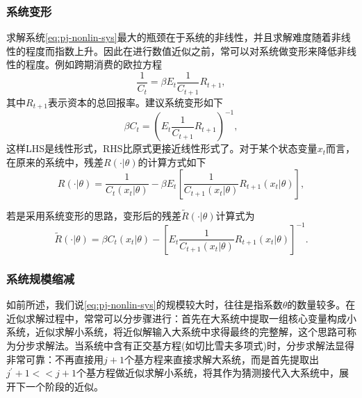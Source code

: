 \subsubsection{系统变形}
\label{sec:pj-approximation-tips-transformation}
求解系统\eqref{eq:pj-nonlin-sys}最大的瓶颈在于系统的非线性，并且求解难度随着非线性的程度而指数上升。因此在进行数值近似之前，常可以对系统做变形来降低非线性的程度。例如跨期消费的欧拉方程
\begin{equation*}
  \frac{1}{C_{t}} = \beta E_{t} \frac{1}{C_{t+1}} R_{t+1},
\end{equation*}
其中$R_{t+1}$表示资本的总回报率。\cite{Judd:1992gs}建议系统变形如下
\begin{equation*}
  \beta C_{t} = \left( E_{t} \frac{1}{C_{t+1}} R_{t+1} \right)^{-1},
\end{equation*}
这样LHS是线性形式，RHS比原式更接近线性形式了。对于某个状态变量$x_{t}$而言，在原来的系统中，残差$R\left( \cdot | \theta \right)$的计算方式如下
\begin{equation*}
  R\left( \cdot | \theta \right) = \frac{1}{
  C_{t} \left( x_{t} | \theta \right)
  }
  - \beta E_{t}
  \left[
  \frac{1}{
  C_{t+1} \left( x_{t} | \theta \right)
  } R_{t+1} \left( x_{t} | \theta \right)
  \right],
\end{equation*}

若是采用系统变形的思路，变形后的残差$\tilde{R} \left( \cdot | \theta \right)$计算式为
\begin{equation*}
  \tilde{R} \left( \cdot | \theta \right)
  = \beta C_{t} \left( x_{t} | \theta \right)
  - \left[
  E_{t} \frac{1}{
  C_{t+1} \left( x_{t} | \theta \right)
  } R_{t+1} \left( x_{t} | \theta \right)
  \right]^{-1}.
\end{equation*}

\subsubsection{系统规模缩减}
\label{sec:pj-approximation-tips-reduction}
如前所述，我们说\eqref{eq:pj-nonlin-sys}的规模较大时，往往是指系数$\theta$的数量较多。在近似求解过程中，常常可以分步骤进行：首先在大系统中提取一组核心变量构成小系统，近似求解小系统，将近似解输入大系统中求得最终的完整解，这个思路可称为分步求解法。当系统中含有正交基方程(如切比雪夫多项式)时，分步求解法显得非常可靠：不再直接用$j+1$个基方程来直接求解大系统，而是首先提取出$j^{'}+1 << j+1$个基方程做近似求解小系统，将其作为猜测接代入大系统中，展开下一个阶段的近似。

